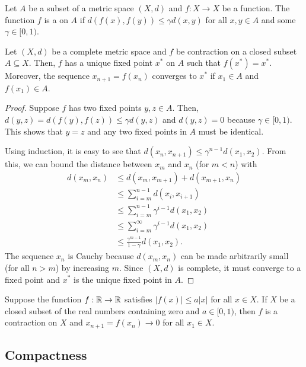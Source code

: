 \begin{definition}
Let $A$ be a subset of a metric space $(X,d)$ and $f: X \rightarrow X$ be a function.
The function $f$ is a  on $A$ if $d \left( f(x),f(y) \right) \leq \gamma  d(x,y)$ for all $x,y\in A$ and some $\gamma \in [0,1)$.
\end{definition}

\begin{theorem}
Let $(X,d)$ be a complete metric space and $f$ be contraction on a closed subset $A \subseteq X$.
Then, $f$ has a unique fixed point $x^*$ on $A$ such that $f(x^*) = x^*$.
Moreover, the sequence $x_{n+1} = f(x_n)$ converges to $x^*$ if $x_1 \in A$ and $f(x_1) \in A$.
\end{theorem}
\begin{proof}
Suppose $f$ has two fixed points $y,z\in A$.
Then, $d(y,z) = d \left(f(y),f(z) \right) \leq \gamma  d(y,z)$ and $d(y,z) = 0$ because $\gamma \in [0,1)$.
This shows that $y=z$ and any two fixed points in $A$ must be identical.

Using induction, it is easy to see that $d(x_n,x_{n+1}) \leq \gamma^{n-1} d(x_1,x_2)$.
From this, we can bound the distance between $x_m$ and $x_n$ (for $m<n$) with
\begin{align*}
d(x_m,x_n)
& \leq d(x_m,x_{m+1}) + d(x_{m+1},x_n) \\
& \leq \sum_{i=m}^{n-1} d(x_i,x_{i+1}) \\
& \leq \sum_{i=m}^{n-1} \gamma^{i-1} d(x_1,x_2) \\
& \leq \sum_{i=m}^\infty \gamma^{i-1} d(x_1,x_2) \\
& \leq \frac{\gamma^{m-1}}{1-\gamma} d(x_1,x_2).
\end{align*}
The sequence $x_n$ is Cauchy because $d(x_m,x_n)$ can be made arbitrarily small (for all $n>m$) by increasing $m$.
Since $(X,d)$ is complete, it must converge to a fixed point and $x^*$ is the unique fixed point in $A$.
\end{proof}

\begin{example}
Suppose the function $f: \mathbb{R} \rightarrow \mathbb{R}$ satisfies $|f(x)| \leq a |x|$ for all $x\in X$.
If $X$ be a closed subset of the real numbers containing zero and $a\in[0,1)$, then $f$ is a contraction on $X$ and $x_{n+1} = f(x_n) \rightarrow 0$ for all $x_1 \in X$.
\end{example}


\subsection{Compactness}

